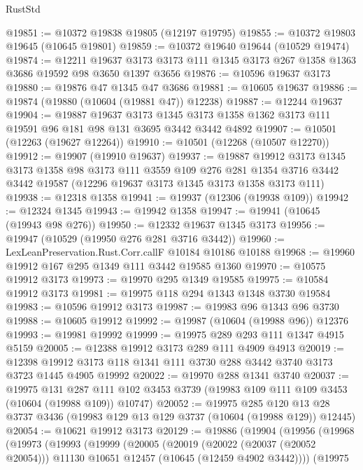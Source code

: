 \begin{lexlean}{RustStd}
\begin{coremodule}
@19851 := @10372 @19838 @19805 (@12197 @19795)
@19855 := @10372 @19803 @19645 (@10645 @19801)
@19859 := @10372 @19640 @19644 (@10529 @19474)
@19874 := @12211
    @19637
    @3173
    @3173
    @111
    @1345
    @3173
    @267
    @1358
    @1363
    @3686
    @19592
    @98
    @3650
    @1397
    @3656
@19876 := @10596 @19637 @3173
@19880 := @19876 @47 @1345 @47 @3686
@19881 := @10605 @19637
@19886 := @19874 (@19880 (@10604 (@19881 @47)) @12238)
@19887 := @12244 @19637
@19904 := @19887
    @19637
    @3173
    @1345
    @3173
    @1358
    @1362
    @3173
    @111
    @19591
    @96
    @181
    @98
    @131
    @3695
    @3442
    @3442
    @4892
@19907 := @10501 (@12263 (@19627 @12264))
@19910 := @10501 (@12268 (@10507 @12270))
@19912 := @19907 (@19910 @19637)
@19937 := @19887
    @19912
    @3173
    @1345
    @3173
    @1358
    @98
    @3173
    @111
    @3559
    @109
    @276
    @281
    @1354
    @3716
    @3442
    @3442
    @19587
    (@12296 @19637 @3173 @1345 @3173 @1358 @3173 @111)
@19938 := @12318 @1358
@19941 := @19937 (@12306 (@19938 @109))
@19942 := @12324 @1345
@19943 := @19942 @1358
@19947 := @19941 (@10645 (@19943 @98 @276))
@19950 := @12332 @19637 @1345 @3173
@19956 := @19947 (@10529 (@19950 @276 @281 @3716 @3442))
@19960 := LexLeanPreservation.Rust.Corr.callF @10184 @10186 @10188
@19968 := @19960 @19912 @167 @295 @1349 @111 @3442 @19585 @1360
@19970 := @10575 @19912 @3173
@19973 := @19970 @295 @1349 @19585
@19975 := @10584 @19912 @3173
@19981 := @19975 @118 @294 @1343 @1348 @3730 @19584
@19983 := @10596 @19912 @3173
@19987 := @19983 @96 @1343 @96 @3730
@19988 := @10605 @19912
@19992 := @19987 (@10604 (@19988 @96)) @12376
@19993 := @19981 @19992
@19999 := @19975 @289 @293 @111 @1347 @4915 @5159
@20005 := @12388 @19912 @3173 @289 @111 @4909 @4913
@20019 := @12398 @19912 @3173 @118 @1341 @111 @3730 @288 @3442 @3740 @3173 @3723 @1445 @4905 @19992
@20022 := @19970 @288 @1341 @3740
@20037 := @19975
    @131
    @287
    @111
    @102
    @3453
    @3739
    (@19983 @109 @111 @109 @3453 (@10604 (@19988 @109)) @10747)
@20052 := @19975
    @285
    @120
    @13
    @28
    @3737
    @3436
    (@19983 @129 @13 @129 @3737 (@10604 (@19988 @129)) @12445)
@20054 := @10621 @19912 @3173
@20129 := @19886
    (@19904
      (@19956
        (@19968
          (@19973
            (@19993
              (@19999
                (@20005
                  (@20019
                    (@20022 (@20037 (@20052 @20054)))
                    @11130
                    @10651
                    @12457
                    (@10645 (@12459 @4902 @3442))))
                (@19975

\end{coremodule}
\end{lexlean}
